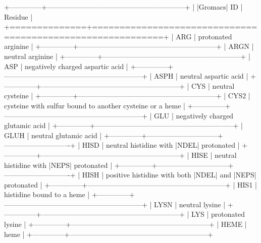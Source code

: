            +--------------+-----------------------------------------------------------+
           | |Gromacs| ID | Residue                                                   |
           +==============+===========================================================+
           | ARG          | protonated arginine                                       |
           +--------------+-----------------------------------------------------------+
           | ARGN         | neutral arginine                                          |
           +--------------+-----------------------------------------------------------+
           | ASP          | negatively charged aspartic acid                          |
           +--------------+-----------------------------------------------------------+
           | ASPH         | neutral aspartic acid                                     |
           +--------------+-----------------------------------------------------------+
           | CYS          | neutral cysteine                                          |
           +--------------+-----------------------------------------------------------+
           | CYS2         | cysteine with sulfur bound to another cysteine or a heme  |
           +--------------+-----------------------------------------------------------+
           | GLU          |  negatively charged glutamic acid                         |
           +--------------+-----------------------------------------------------------+
           | GLUH         |  neutral glutamic acid                                    |
           +--------------+------------------------------+----------------------------+
           | HISD         | neutral histidine with |NDEL| protonated                  |
           +--------------+-----------------------------------------------------------+
           | HISE         | neutral histidine with |NEPS| protonated                  |
           +--------------+------------------------------+----------------------------+
           | HISH         | positive histidine with both |NDEL| and |NEPS| protonated |
           +--------------+-----------------------------------------------------------+
           | HIS1         | histidine bound to a heme                                 |
           +--------------+-----------------------------------------------------------+
           | LYSN         | neutral lysine                                            |
           +--------------+-----------------------------------------------------------+
           | LYS          | protonated lysine                                         |
           +--------------+-----------------------------------------------------------+
           | HEME         | heme                                                      |
           +--------------+-----------------------------------------------------------+


